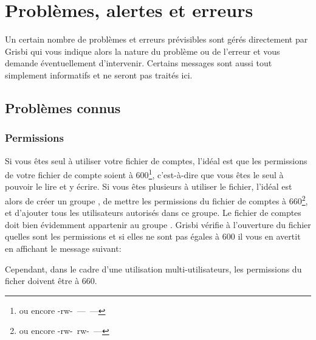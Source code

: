 

\chapter{Problèmes, alertes et erreurs\label{problems}}

Un certain nombre de problèmes et erreurs prévisibles sont gérés directement par
Grisbi qui vous indique alors la nature du problème ou de l'erreur et vous
demande éventuellement d'intervenir. Certains messages sont aussi tout
simplement informatifs et ne seront pas traités ici.

\section{Problèmes connus\label{problems-known} }

\subsection{Permissions\label{problems-known-rights} }

Si vous êtes seul à utiliser votre fichier de comptes, l'idéal est que les permissions de votre fichier de compte soient à 600\footnote{ou encore -rw-~---~---},
c'est-à-dire que vous êtes le seul à pouvoir le lire et y écrire. Si vous êtes plusieurs à utiliser le fichier, l'idéal est alors de créer un groupe , de mettre les permissions du fichier de comptes à 660\footnote{ou encore -rw-~rw-~---}, et d'ajouter tous les utilisateurs autorisés dans ce groupe. Le fichier de comptes doit bien évidemment appartenir au groupe .
Grisbi vérifie à l'ouverture du fichier quelles sont les permissions et si elles ne sont pas égales à 600 il vous en avertit en affichant le message suivant: 

\begin{center}

\end{center}

Cependant, dans le cadre d'une utilisation multi-utilisateurs, les permissions du
ficher doivent être à 660.

